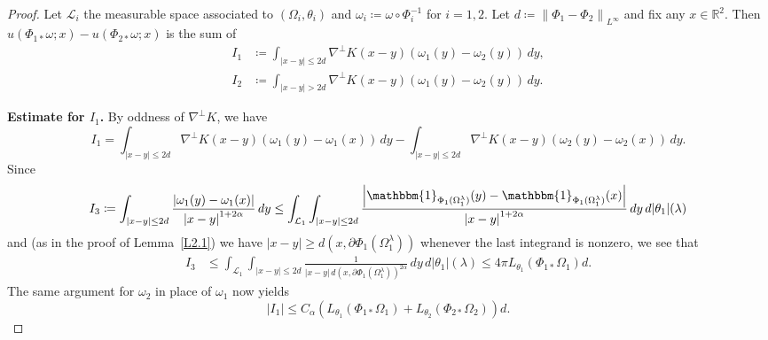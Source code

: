 \documentclass[reqno,centertags,12pt]{amsart}
\theoremstyle{definition}
\numberwithin{equation}{section}
\newcommand{\abs}[1]{\left\lvert#1\right\rvert}
\newcommand{\norm}[1]{\left\|#1\right\|}
\newcommand{\bbR}{{\mathbb{R}}}
\begin{document}
\begin{proof}
    Let    $\mathcal{L}_{i}$ the measurable space associated to $(\Omega_{i},\theta_{i})$ and
    $\omega_{i}\coloneqq \omega\circ\Phi_{i}^{-1}$ for $i=1,2$.  Let $d\coloneqq\norm{\Phi_{1} - \Phi_{2}}_{L^{\infty}}$ and fix any $x\in\bbR^{2}$.
    Then $u(\Phi_{1*}\omega;x) - u(\Phi_{2*}\omega;x)$ is the sum of
    \begin{align*}
        I_{1} &\coloneqq \int_{\abs{x - y}\leq 2d}
        \nabla^{\perp}K(x - y)(\omega_{1}(y) - \omega_{2}(y))\,dy, \\
        I_{2} &\coloneqq \int_{\abs{x - y} > 2d}
        \nabla^{\perp}K(x - y)(\omega_{1}(y) - \omega_{2}(y))\,dy.
    \end{align*}

    \textbf{Estimate for $I_{1}$.} By oddness of $\nabla^{\perp}K$, we have
    \[
        I_{1} = \int_{\abs{x - y}\leq 2d}\nabla^{\perp}K(x - y)
        (\omega_{1}(y) - \omega_{1}(x))\,dy
        - \int_{\abs{x - y}\leq 2d}\nabla^{\perp}K(x - y)
        (\omega_{2}(y) - \omega_{2}(x))\,dy.
    \]
Since
    \[
        I_{3} \coloneqq \int_{\abs{x - y} \leq 2d}
        \frac{\abs{\omega_{1}(y) - \omega_{1}(x)}}{\abs{x - y}^{1 + 2\alpha}}\,dy
        \leq \int_{\mathcal{L}_{1}}\int_{\abs{x - y}\leq 2d}
        \frac{\abs{\mathbbm{1}_{\Phi_{1}(\Omega_{1}^{\lambda})}(y)
        - \mathbbm{1}_{\Phi_{1}(\Omega_{1}^{\lambda})}(x)}}
        {\abs{x - y}^{1+2\alpha}}\,dy\,d|\theta_{1}|(\lambda)
    \]
    and (as in the proof of Lemma~\ref{L2.1})
    we have $\abs{x - y} \geq d(x,\partial\Phi_{1}(\Omega_{1}^{\lambda}))$
    whenever the  last integrand  is nonzero,
    we see that
    \begin{align*}
        I_{3} &\leq \int_{\mathcal{L}_{1}}\int_{\abs{x - y}\leq 2d}
        \frac{1}{\abs{x - y}\, d(x,\partial\Phi_{1}(\Omega_{1}^{\lambda}))^{2\alpha}}
        \,dy\,d|\theta_{1}|(\lambda)
        \leq 4\pi L_{\theta_{1}}(\Phi_{1*}\Omega_{1})d.
    \end{align*}
    The same argument for $\omega_{2}$ in place of $\omega_{1}$ now yields
    \begin{equation} \label{2.100}
        \abs{I_{1}}\leq C_{\alpha}\left(
            L_{\theta_{1}}(\Phi_{1*}\Omega_{1}) + L_{\theta_{2}}(\Phi_{2*}\Omega_{2})
        \right)d.
    \end{equation}


\end{proof}
\end{document}
